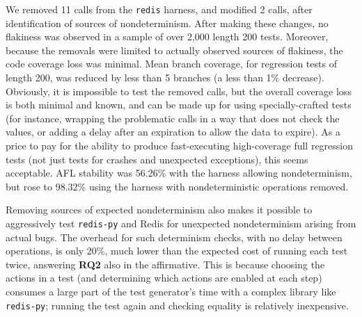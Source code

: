 We removed 11 calls from the {\tt redis} harness, and  modified 2
calls, after
identification of sources of nondeterminism.  After making these changes, no flakiness was observed in a sample of over 2,000 length
200 tests.   Moreover, because the removals were limited to actually
observed sources of flakiness, the code coverage loss was minimal.
Mean branch coverage, for regression tests of length 200, was reduced
by less than 5 branches (a less than 1\% decrease).  Obviously, it is
impossible to test the removed calls, but the overall coverage loss is
both minimal and known, and can be made up for using specially-crafted
tests (for instance, wrapping the problematic calls in a way that does
not check the values, or adding a delay after an expiration to allow
the data to expire).  As a price to pay for the ability to produce
fast-executing high-coverage full regression tests (not just tests for
crashes and unexpected exceptions), this seems acceptable.  AFL stability was 56.26\% with the harness allowing 
nondeterminism, but rose to 98.32\% using the harness with 
nondeterministic operations removed.

Removing sources of expected nondeterminism also makes
it possible to aggressively test {\tt redis-py} and Redis for
unexpected nondeterminism arising from actual bugs.  The overhead for such
determinism checks, with no delay between operations, is only
20\%, much lower than the expected cost of running each test twice,
answering {\bf RQ2} also in the affirmative.  This is because choosing the actions in a test (and determining which
actions are enabled at each step) consumes a large part of the test
generator's time with a complex library like {\tt redis-py}; running the test again and checking equality is
relatively inexpensive.   

